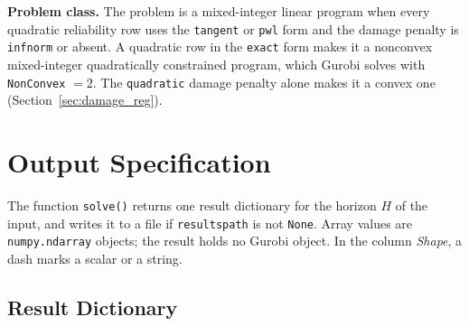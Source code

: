 \documentclass[11pt,a4paper]{article}
\theoremstyle{plain}
\theoremstyle{definition}
\renewcommand{\_}{\textunderscore\allowbreak{}}
\begin{document}
\textbf{Problem class.} The problem is a mixed-integer linear program when every
quadratic reliability row uses the \texttt{tangent} or \texttt{pwl} form and the
damage penalty is \texttt{inf\_norm} or absent. A quadratic row in the \texttt{exact}
form makes it a nonconvex mixed-integer quadratically constrained program, which
Gurobi solves with \texttt{NonConvex} $= 2$. The \texttt{quadratic} damage penalty
alone makes it a convex one (Section~\ref{sec:damage_reg}).

\section{Output Specification}\label{sec:output}

The function \texttt{solve()} returns one result dictionary for the horizon $H$ of the input, and writes it to a file if \texttt{results\_path} is not \texttt{None}. Array values are \texttt{numpy.ndarray} objects; the result holds no Gurobi object.
In the column \emph{Shape}, a dash marks a scalar or a string.

\subsection{Result Dictionary}
\end{document}
